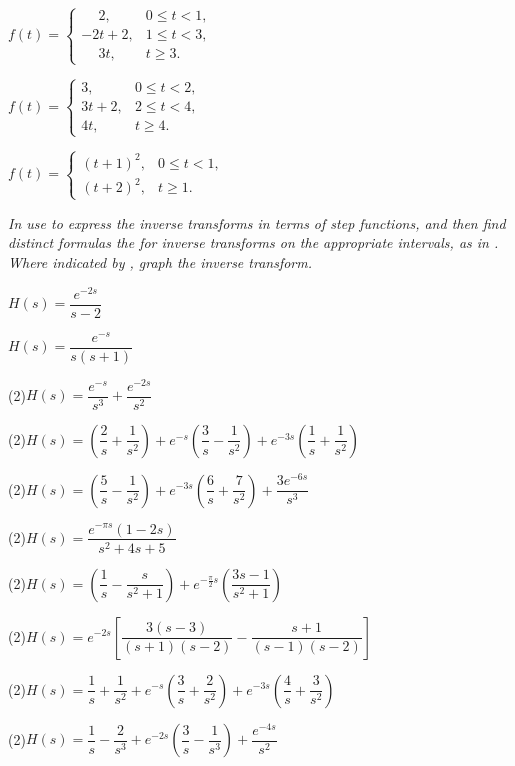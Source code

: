 \begin{exerciselistTwoColumn}
\item\label{exer:8.4.16}\CGex
$f(t)=\begin{cases}
\phantom{-} 2,&0\le t<1,\\
-2t+2,&1\le t<3,\\
\phantom{-}3t,&t\ge3.\end{cases}$


\item\label{exer:8.4.17}\CGex
$f(t)=\begin{cases}
3,&0\le t<2,\\
3t+2,&2\le t<4,\\
4t,&t\ge 4.\end{cases}$

\item\label{exer:8.4.18}\CGex
$f(t)=\begin{cases}
(t+1)^2,&0\le t<1,\\
(t+2)^2,&t\ge1.\end{cases}$
\end{exerciselistTwoColumn}
%
\textsl{In  use
 to express the inverse transforms in terms of
step functions, and then find distinct formulas the for inverse
transforms on the appropriate intervals, as in
.
Where indicated by \CGex, graph the inverse transform.}
\begin{exerciselistTwoColumn}
\item\label{exer:8.4.19}$H(s)=\dfrac{e^{-2s}}{s-2}$
\item\label{exer:8.4.20}$H(s)=\dfrac{e^{-s}}{s(s+1)}$
\item(2)\label{exer:8.4.21}\CGex $H(s)=\dfrac{e^{-s}}{s^3}+
\dfrac{e^{-2s}}{s^2}$

\item(2)\label{exer:8.4.22}\CGex $H(s)=\left(\dfrac{2}{s}+\dfrac{1}{s^2}\right)
+e^{-s}\left(\dfrac{3}{s}-\dfrac{1}{s^2}\right)+e^{-3s}\left(\dfrac{1}{s}+\dfrac{1}{s^2}\right)$

\item(2)\label{exer:8.4.23}$H(s)=\left(\dfrac{5}{s}-\dfrac{1}{s^2}\right)
+e^{-3s}\left(\dfrac{6}{s}+\dfrac{7}{s^2}\right)+\dfrac{3e^{-6s}}{s^3}$

\item(2)\label{exer:8.4.24}$H(s)=\dfrac{e^{-\pi s} (1-2s)}{s^2+4s+5}$

\item(2)\label{exer:8.4.25}\CGex $H(s)=\left(\dfrac{1}{s}-\dfrac{s}{s^2+1}\right)+e^{-\frac{\pi}{2}s}\left(\dfrac{3s-1}{s^2+1}\right)$

\item(2)\label{exer:8.4.26}$H(s)=
e^{-2s}\left[\dfrac{3(s-3)}{(s+1)(s-2)}-\dfrac{s+1}{(s-1)(s-2)}\right]$

\item(2)\label{exer:8.4.27}$H(s)=\dfrac{1}{s}+\dfrac{1}{s^2}+e^{-s}\left(\dfrac{3}{s}+\dfrac{2}{s^2}\right) +e^{-3s}\left(\dfrac{4}{s}+\dfrac{3}{s^2}\right)$

\item(2)\label{exer:8.4.28}$H(s)=\dfrac{1}{s}-\dfrac{2}{s^3}+e^{-2s}\left(\dfrac{3}{s}-\dfrac{1}{s^3}\right) +\dfrac{e^{-4s}}{s^2}$
\end{exerciselistTwoColumn}
